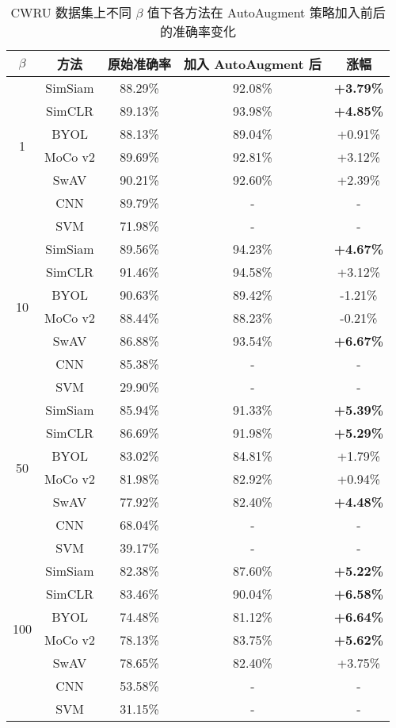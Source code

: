 \documentclass[master]{thesis-uestc}
\begin{document}
\begin{table}[!h]
    \caption{CWRU 数据集上不同 $\beta$ 值下各方法在 AutoAugment 策略加入前后的准确率变化}
    \centering
    \renewcommand\arraystretch{1.2}
    \begin{tabular}{ccccc}
    \toprule
    $\beta$ & 方法 & 原始准确率 & 加入 AutoAugment 后 & 涨幅 \\
    \midrule
    \multirow{6}{*}{1}   
        & SimSiam & 88.29\% & 92.08\% & \textbf{+3.79\%} \\
        & SimCLR  & 89.13\% & 93.98\% & \textbf{+4.85\%} \\
        & BYOL    & 88.13\% & 89.04\% & +0.91\% \\
        & MoCo v2 & 89.69\% & 92.81\% & +3.12\% \\
        & SwAV    & 90.21\% & 92.60\% & +2.39\% \\
        & CNN     & 89.79\% & -       & - \\
        & SVM     & 71.98\% & -       & - \\
    \midrule
    \multirow{6}{*}{10}  
        & SimSiam & 89.56\% & 94.23\% & \textbf{+4.67\%} \\
        & SimCLR  & 91.46\% & 94.58\% & +3.12\% \\
        & BYOL    & 90.63\% & 89.42\% & -1.21\% \\
        & MoCo v2 & 88.44\% & 88.23\% & -0.21\% \\
        & SwAV    & 86.88\% & 93.54\% & \textbf{+6.67\%} \\
        & CNN     & 85.38\% & -       & - \\
        & SVM     & 29.90\% & -       & - \\
    \midrule
    \multirow{6}{*}{50}  
        & SimSiam & 85.94\% & 91.33\% & \textbf{+5.39\%} \\
        & SimCLR  & 86.69\% & 91.98\% & \textbf{+5.29\%} \\
        & BYOL    & 83.02\% & 84.81\% & +1.79\% \\
        & MoCo v2 & 81.98\% & 82.92\% & +0.94\% \\
        & SwAV    & 77.92\% & 82.40\% & \textbf{+4.48\%} \\
        & CNN     & 68.04\% & -       & - \\
        & SVM     & 39.17\% & -       & - \\
    \midrule
    \multirow{6}{*}{100} 
        & SimSiam & 82.38\% & 87.60\% & \textbf{+5.22\%} \\
        & SimCLR  & 83.46\% & 90.04\% & \textbf{+6.58\%} \\
        & BYOL    & 74.48\% & 81.12\% & \textbf{+6.64\%} \\
        & MoCo v2 & 78.13\% & 83.75\% & \textbf{+5.62\%} \\
        & SwAV    & 78.65\% & 82.40\% & +3.75\% \\
        & CNN     & 53.58\% & -       & - \\
        & SVM     & 31.15\% & -       & - \\
    \bottomrule
    \end{tabular}
    \label{tab:longtail_autoaugment_comparison}
\end{table}
\end{document}
